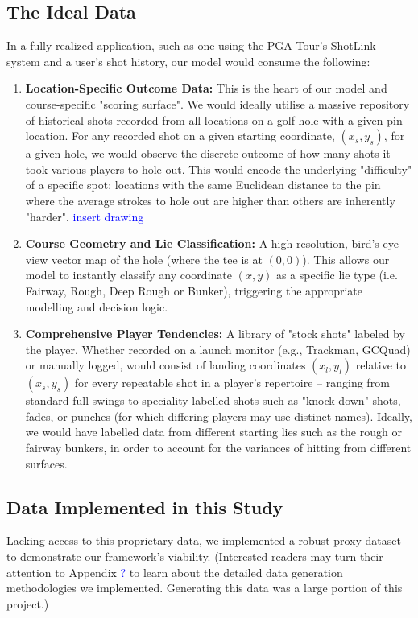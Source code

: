 \documentclass[11pt, letterpaper]{article}
\begin{document}
\subsection{The Ideal Data}
In a fully realized application, such as one using the PGA Tour's ShotLink system and a user's shot history, our model would consume the following:
\begin{enumerate}
    \item \textbf{Location-Specific Outcome Data:} This is the heart of our model and course-specific "scoring surface". We would ideally utilise a massive repository of historical shots recorded from all locations on a golf hole with a given pin location. For any recorded shot on a given starting coordinate, $(x_s,y_s)$, for a given hole, we would observe the discrete outcome of how many shots it took various players to hole out. This would encode the underlying "difficulty" of a specific spot: locations with the same Euclidean distance to the pin where the average strokes to hole out are higher than others are inherently "harder". \textcolor{blue}{insert drawing}
    \item \textbf{Course Geometry and Lie Classification:} A high resolution, bird's-eye view vector map of the hole (where the tee is at $(0,0)$). This allows our model to instantly classify any coordinate $(x,y)$ as a specific lie type (i.e. Fairway, Rough, Deep Rough or Bunker), triggering the appropriate modelling and decision logic.
    \item \textbf{Comprehensive Player Tendencies:} A library of "stock shots" labeled by the player. Whether recorded on a launch monitor (e.g., Trackman, GCQuad) or manually logged, would consist of landing coordinates $(x_l,y_l)$ relative to $(x_s,y_s)$ for every repeatable shot in a player's repertoire – ranging from standard full swings to speciality labelled shots such as "knock-down" shots, fades, or punches (for which differing players may use distinct names). Ideally, we would have labelled data from different starting lies such as the rough or fairway bunkers, in order to account for the variances of hitting from different surfaces.
\end{enumerate}

\subsection{Data Implemented in this Study}
Lacking access to this proprietary data, we implemented a robust proxy dataset to demonstrate our framework's viability. (Interested readers may turn their attention to Appendix \textcolor{blue}{?} to learn about the detailed data generation methodologies we implemented. Generating this data was a large portion of this project.)
\end{document}
